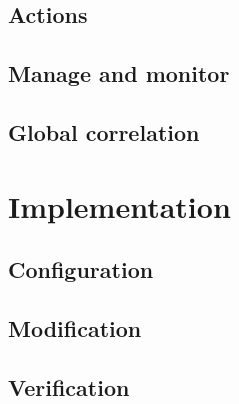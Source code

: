 \subsection{Actions}

\subsection{Manage and monitor}

\subsection{Global correlation}

\section{Implementation}

\subsection{Configuration}

\subsection{Modification}

\subsection{Verification}